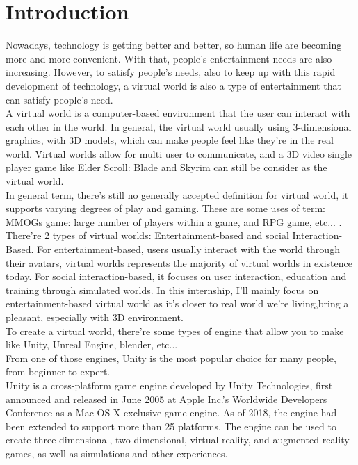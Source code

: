\documentclass[a4paper, 13pt]{extarticle}
\begin{document}
\newpage
\section{\Large Introduction} 
Nowadays, technology is getting better and better, so human life are becoming more and more convenient. With that, people's entertainment needs are also increasing. However, to satisfy people's needs, also to keep up with this rapid development of technology, a virtual world is also a type of entertainment that can satisfy people's need. \\[0.35cm]  A virtual world is a computer-based environment that the user can interact with each other in the world. In general, the virtual world usually using 3-dimensional graphics, with 3D models, which can make people feel like they're in the real world. Virtual worlds allow for multi user to communicate, and a 3D video single player game like Elder Scroll: Blade and Skyrim can still be consider as the virtual world. \\[0.35cm] In general term, there's still no generally accepted definition for virtual world, it supports varying degrees of play and gaming. These are some uses of term: MMOGs game: large number of players within a game, and RPG game, etc... . There're 2 types of virtual worlds: Entertainment-based and social Interaction-Based. For entertainment-based, users usually interact with the world through their avatars, virtual worlds represents the majority of virtual worlds in existence today. For social interaction-based, it focuses on user interaction, education and training through simulated worlds. In this internship, I'll mainly focus on entertainment-based virtual world as it's closer to real world we're living,bring a pleasant, especially with 3D environment. \\[0.35cm] To create a virtual world, there're some types of engine that allow you to make like Unity, Unreal Engine, blender, etc... \\[0.35cm] From one of those engines, Unity is the most popular choice for many people, from beginner to expert. \\[0.35cm] Unity is a cross-platform game engine developed by Unity Technologies, first announced and released in June 2005 at Apple Inc.'s Worldwide Developers Conference as a Mac OS X-exclusive game engine. As of 2018, the engine had been extended to support more than 25 platforms. The engine can be used to create three-dimensional, two-dimensional, virtual reality, and augmented reality games, as well as simulations and other experiences. \\[0.35cm]
\end{document}
